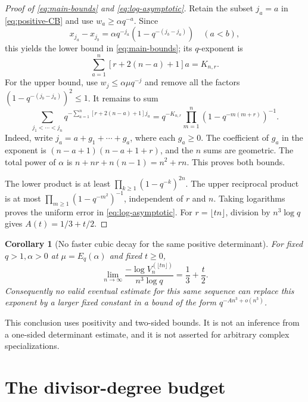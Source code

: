 \documentclass[11pt]{article}
\numberwithin{equation}{section}
\newtheorem{corollary}[corollary]{Corollary}
\theoremstyle{definition}
\theoremstyle{remark}
\begin{document}
\begin{proof}[Proof of \eqref{eq:main-bounds} and \eqref{eq:log-asymptotic}]
Retain the subset $j_a=a$ in \eqref{eq:positive-CB} and use
$w_a\ge\alpha q^{-a}$. Since
\[
 x_{j_a}-x_{j_b}=\alpha q^{-j_a}(1-q^{-(j_b-j_a)})\quad(a<b),
\]
this yields the lower bound in \eqref{eq:main-bounds}; its $q$-exponent is
\[
 \sum_{a=1}^n[r+2(n-a)+1]a=K_{n,r}.
\]
For the upper bound, use $w_j\le\alpha\mu q^{-j}$ and remove all the
factors $(1-q^{-(j_b-j_a)})^2\le1$. It remains to sum
\begin{equation}\label{eq:gap-sum}
 \sum_{j_1<\cdots<j_n}
 q^{-\sum_{a=1}^n[r+2(n-a)+1]j_a}
 =q^{-K_{n,r}}\prod_{m=1}^n(1-q^{-m(m+r)})^{-1}.
\end{equation}
Indeed, write $j_a=a+g_1+\cdots+g_a$, where each $g_a\ge0$.
The coefficient of $g_a$ in the exponent is
$(n-a+1)(n-a+1+r)$, and the $n$ sums are geometric.
The total power of $\alpha$ is $n+nr+n(n-1)=n^2+rn$.
This proves both bounds.

The lower product is at least
$\prod_{k\ge1}(1-q^{-k})^{2n}$.
The upper reciprocal product is at most
$\prod_{m\ge1}(1-q^{-m^2})^{-1}$, independent of $r$ and $n$.
Taking logarithms proves the uniform error in \eqref{eq:log-asymptotic}.
For $r=\lfloor tn\rfloor$, division by $n^3\log q$ gives
$A(t)=1/3+t/2$.
\end{proof}

\begin{corollary}[No faster cubic decay for the same positive determinant]
For fixed $q>1,\alpha>0$ at $\mu=E_q(\alpha)$ and fixed $t\ge0$,
\[
 \lim_{n\to\infty}\frac{-\log V_n^{(\lfloor tn\rfloor)}}{n^3\log q}
 =\frac13+\frac t2.
\]
Consequently no valid eventual estimate for this same sequence can replace
this exponent by a larger fixed constant in a bound of the form
$q^{-An^3+o(n^3)}$.
\end{corollary}

This conclusion uses positivity and two-sided bounds. It is not an inference
from a one-sided determinant estimate, and it is not asserted for arbitrary
complex specializations.

\section{The divisor-degree budget}\label{sec:budget}
\end{document}
